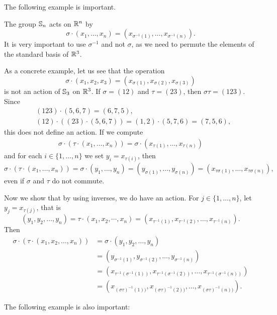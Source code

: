 The following example is important. 

\begin{example}
    The group $\mathbb{S}_n$ acts on $\mathbb{R}^n$ by
    \[
    \sigma\cdot (x_1,\dots,x_n)=(x_{\sigma^{-1}(1)},\dots,x_{\sigma^{-1}(n)}).
    \]
    It is very important to use $\sigma^{-1}$ and not 
    $\sigma$, as we need to permute the elements of the standard basis of $\mathbb{R}^3$.

    As a concrete example, let us see that the operation 
    \[
    \sigma\cdot (x_1,x_2,x_3)=(x_{\sigma(1)},x_{\sigma(2)},x_{\sigma(3)})
    \]
    is not an action of $\mathbb{S}_3$ on $\mathbb{R}^3$.
    If $\sigma=(12)$ and $\tau=(23)$, then $\sigma\tau=(123)$. Since 
    \begin{align*}
    &(123)\cdot (5,6,7)=(6,7,5),\\
    &(12)\cdot ((23)\cdot (5,6,7))=(1,2)\cdot (5,7,6)=(7,5,6),
    \end{align*}
    this does not define an action. If we compute 
    \begin{align*}
        \sigma\cdot (\tau\cdot (x_1,\dots,x_n))
        =\sigma\cdot (x_{\tau(1)},\dots,x_{\tau(n)})
    \end{align*}
    and for each $i\in\{1,\dots,n\}$ we set $y_i=x_{\tau(i)}$, then 
    \[
    \sigma\cdot (\tau\cdot (x_1,\dots,x_n))=\sigma\cdot (y_1,\dots,y_n)=(y_{\sigma(1)},\dots,y_{\sigma(n)})
    =(x_{\tau\sigma(1)},\dots,x_{\tau\sigma(n)}),
    \]
    even if $\sigma$ and $\tau$ do not commute.

    Now we show that by using inverses, we do have an action. 
    For $j\in\{1,\dots,n\}$, let $y_j=x_{\tau(j)}$,
    that is 
    \[
    (y_1,y_2,\dots,y_n)=\tau\cdot (x_1,x_2,\cdots,x_n)=(x_{\tau^{-1}(1)},x_{\tau^{-1}(2)},\dots,x_{\tau^{-1}(n)}).
    \]
    Then 
    \begin{align*}
        \sigma\cdot (\tau\cdot (x_1,x_2,\dots,x_n))&=\sigma\cdot (y_1,y_2,\dots,y_n)\\
        &=\left(y_{\sigma^{-1}(1)},y_{\sigma^{-1}(2)},\dots,y_{\sigma^{-1}(n)}\right)\\
        &=\left(x_{\tau^{-1}(\sigma^{-1}(1))},x_{\tau^{-1}(\sigma^{-1}(2))},\dots,x_{\tau^{-1}(\sigma
^{-1}(n))}\right)\\
        &=\left(x_{(\sigma\tau)^{-1}(1))},x_{(\sigma\tau)^{-1}(2))},\dots,x_{(\sigma\tau)^{-1}(n))}\right).
    \end{align*}
\end{example}

The following example is also important: 

